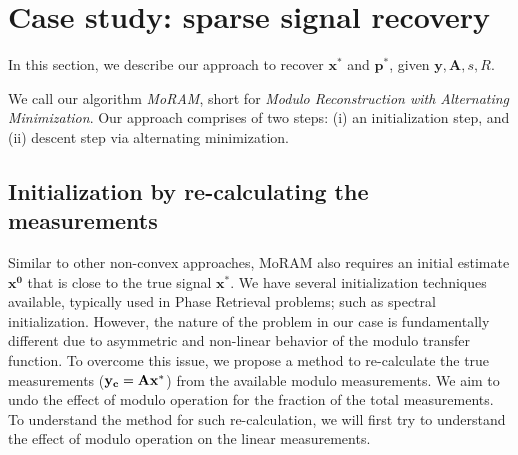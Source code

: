 \section{Case study: sparse signal recovery}
\label{sec:algo}
In this section, we describe our approach to recover $\mathbf{x^*}$ and $\mathbf{p^*}$, given $\mathbf{y, A}, s, R$. 

We call our algorithm \emph{MoRAM}, short for \emph{Modulo Reconstruction with Alternating Minimization}. Our approach comprises of two steps: (i) an initialization step, and (ii) descent step via alternating minimization.

\subsection{Initialization by re-calculating the measurements}
\label{sec:init}
Similar to other non-convex approaches, MoRAM also requires an initial estimate $\mathbf{{x}^0}$ that is close to the true signal $\mathbf{{x}^*}$. We have several initialization techniques available, typically used in Phase Retrieval problems; such as spectral initialization. However, the nature of the problem in our case is fundamentally different due to asymmetric and non-linear behavior of the modulo transfer function. To overcome this issue, we propose a method to re-calculate the true measurements ($\mathbf{y_c}= \mathbf{Ax^*}$) from the available modulo measurements. We aim to undo the effect of modulo operation for the fraction of the total measurements. To understand the method for such re-calculation, we will first try to understand the effect of modulo operation on the linear measurements.

